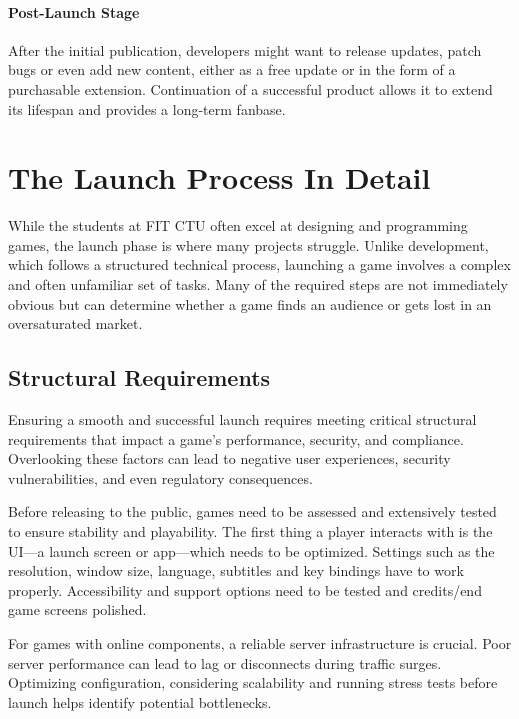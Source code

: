 \paragraph{Post-Launch Stage}
After the initial publication, developers might want to release updates, patch bugs or even add new content, either as a free update or in the form of a purchasable extension. Continuation of a successful product allows it to extend its lifespan and provides a long-term fanbase.
\cite{bramble_7-stages, rocket_6-stages}

\section{The Launch Process In Detail}
While the students at FIT CTU often excel at designing and programming games, the launch phase is where many projects struggle. Unlike development, which follows a structured technical process, launching a game involves a complex and often unfamiliar set of tasks. Many of the required steps are not immediately obvious but can determine whether a game finds an audience or gets lost in an oversaturated market.

\subsection{Structural Requirements}
Ensuring a smooth and successful launch requires meeting critical structural requirements that impact a game’s performance, security, and compliance. Overlooking these factors can lead to negative user experiences, security vulnerabilities, and even regulatory consequences.

Before releasing to the public, games need to be assessed and extensively tested to ensure stability and playability. The first thing a player interacts with is the UI---a launch screen or app---which needs to be optimized. Settings such as the resolution, window size, language, subtitles and key bindings have to work properly. Accessibility and support options need to be tested and credits/end game screens polished.
\cite{silva_guide-to-release}

For games with online components, a reliable server infrastructure is crucial. Poor server performance can lead to lag or disconnects during traffic surges. Optimizing configuration, considering scalability and running stress tests before launch helps identify potential bottlenecks.
\cite{sentika_how-to-optimize}

